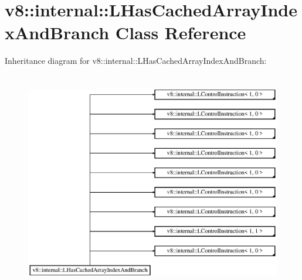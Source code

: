\hypertarget{classv8_1_1internal_1_1_l_has_cached_array_index_and_branch}{}\section{v8\+:\+:internal\+:\+:L\+Has\+Cached\+Array\+Index\+And\+Branch Class Reference}
\label{classv8_1_1internal_1_1_l_has_cached_array_index_and_branch}
Inheritance diagram for v8\+:\+:internal\+:\+:L\+Has\+Cached\+Array\+Index\+And\+Branch\+:\begin{figure}[H]
\begin{center}
\leavevmode
\includegraphics[height=9.722222cm]{classv8_1_1internal_1_1_l_has_cached_array_index_and_branch}
\end{center}
\end{figure}
